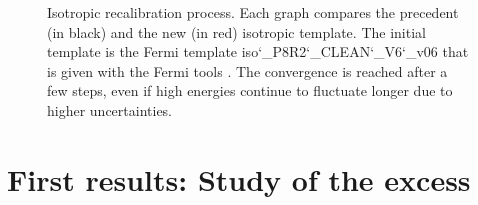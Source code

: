\begin{figure}[H]
\begin{minipage}[h]{0.45\textwidth}
  	\subcaption{}
  	\label{app:app_iso_process_4}
  \end{minipage}
  \caption[Isotropic template convergence.]{Isotropic recalibration process. Each graph compares the precedent (in black) and the new (in red) isotropic template. The initial template is the Fermi template iso\char`_P8R2\char`_CLEAN\char`_V6\char`_v06 that is given with the Fermi tools \cite{FermiTools}. The convergence is reached after a few steps, even if high energies continue to fluctuate longer due to higher uncertainties.}
  \label{app:app_iso_process}
\end{figure}





\newpage
\section{First results: Study of the excess}
\label{app:BKG_distributions}
